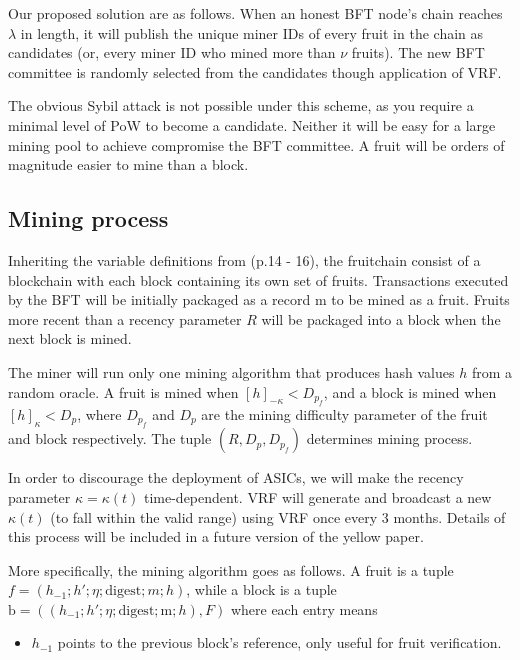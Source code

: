 \documentclass[9pt,oneside]{amsart}
\begin{document}
\begin{multicols}{2}
Our proposed solution are as follows. When an honest BFT node's chain reaches $\lambda$ in length, it will publish the unique miner IDs of every fruit in the chain as candidates (or, every miner ID who mined more than $\nu$ fruits). The new BFT committee is randomly selected from the candidates though application of VRF.  

The obvious Sybil attack is not possible under this scheme, as you require a minimal level of PoW to become a candidate. Neither it will be easy for a large mining pool to achieve compromise the BFT committee. A fruit will be orders of magnitude easier to mine than a block. 


\subsection{Mining process}

Inheriting the variable definitions from \cite{pass2017fruit} (p.14 - 16), the fruitchain consist of a blockchain with each block containing its own set of fruits. Transactions executed by the BFT will be initially packaged as a record $\mathrm{m}$ to be mined as a fruit. Fruits more recent than a recency parameter $R$ will be packaged into a block when the next block is mined. 

The miner will run only one mining algorithm that produces hash values $h$ from a random oracle. A fruit is mined when $[h]_{-\kappa} < D_{p_f}$, and a block is mined when $[h]_{\kappa} < D_{p}$, where $D_{p_f}$ and $D_p$ are the mining difficulty parameter of the fruit and block respectively. The tuple $(R, D_p, D_{p_f})$ determines mining process. 

In order to discourage the deployment of ASICs, we will make the recency parameter $\kappa = \kappa (t)$ time-dependent. VRF will generate and broadcast a new $\kappa (t)$ (to fall within the valid range) using VRF once every 3 months. Details of this process will be included in a future version of the yellow paper. 


More specifically, the mining algorithm goes as follows. A fruit is a tuple $f = (h_{-1}; h'; \eta ; \mathrm{digest}; m; h)$, while a block is a tuple $\mathrm{b} = ((h_{-1}; h'; \eta; \mathrm{digest}; \mathrm{m}; h), F)$ where each entry means

\begin{itemize}
	\item $h_{-1}$ points to the previous block's reference, only useful for fruit verification.
	

\end{itemize}
\end{multicols}
\end{document}
